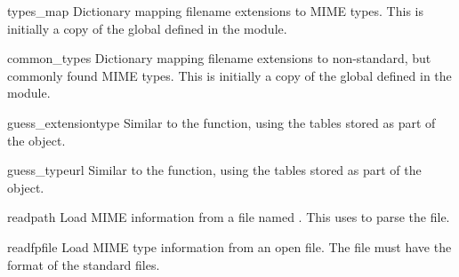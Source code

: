 \begin{datadesc}{types_map}
  Dictionary mapping filename extensions to MIME types.  This is
  initially a copy of the global  defined in the
  module.
\end{datadesc}

\begin{datadesc}{common_types}
  Dictionary mapping filename extensions to non-standard, but commonly
  found MIME types.  This is initially a copy of the global
   defined in the module.
\end{datadesc}

\begin{methoddesc}{guess_extension}{type}
  Similar to the  function, using the
  tables stored as part of the object.
\end{methoddesc}

\begin{methoddesc}{guess_type}{url}
  Similar to the  function, using the tables
  stored as part of the object.
\end{methoddesc}

\begin{methoddesc}{read}{path}
  Load MIME information from a file named .  This uses
   to parse the file.
\end{methoddesc}

\begin{methoddesc}{readfp}{file}
  Load MIME type information from an open file.  The file must have
  the format of the standard  files.
\end{methoddesc}
